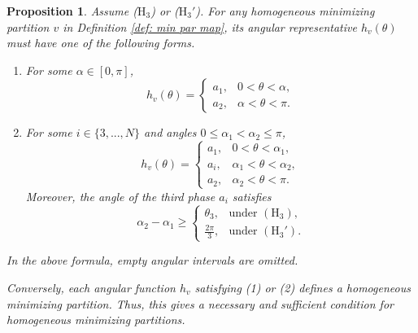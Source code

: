 \documentclass[leqno,11pt]{amsart}
\let\al=\alpha
\let\f=\frac
\newtheorem{proposition}[theorem]{Proposition}
\theoremstyle{remark}
\begin{document}
\begin{proposition}\label{prop: cla of blowdown}
    Assume ($\mathrm{H}_3$) or ($\mathrm{H}_3'$). For any homogeneous minimizing partition $v$ in Definition \ref{def: min par map}, its angular representative $h_v(\theta)$ must have one of the following forms.
    \begin{enumerate}
        \item For some $\al\in[0,\pi]$, 
        \begin{equation}
            \label{1 jump}
            h_v(\theta)=\begin{cases}
                a_1, & 0<\theta<\al,\\
                a_2, & \al<\theta<\pi.
            \end{cases}
        \end{equation}
        \item For some $i\in\{3,...,N\}$ and angles $0\leq \al_1<\al_2\leq \pi$,
        \begin{equation}
            \label{2 jump}
            h_v(\theta)=\begin{cases}
                a_1, & 0<\theta<\al_1,\\
                a_i,& \al_1<\theta<\al_2,\\
                a_2, & \al_2<\theta<\pi.
            \end{cases}
        \end{equation}
        Moreover, the angle of the third phase $a_i$ satisfies
        \begin{equation*}
            \al_2-\al_1 \geq \begin{cases}
                \theta_3, & \text{under }(\mathrm{H}_3), \\
                \f{2\pi}{3}, & \text{under }(\mathrm{H}_3').
            \end{cases}
        \end{equation*}
    \end{enumerate}
    In the above formula, empty angular intervals are omitted.

    Conversely, each angular function $h_v$ satisfying (1) or (2) defines a homogeneous minimizing partition. Thus, this gives a necessary and sufficient condition for homogeneous minimizing partitions.
\end{proposition}
\end{document}
